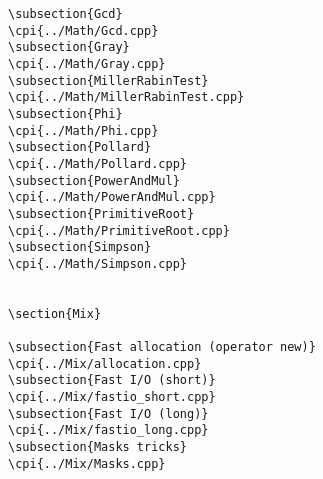 {\begin{verbatim}
\subsection{Gcd}
\cpi{../Math/Gcd.cpp}
\subsection{Gray}
\cpi{../Math/Gray.cpp}
\subsection{MillerRabinTest}
\cpi{../Math/MillerRabinTest.cpp}
\subsection{Phi}
\cpi{../Math/Phi.cpp}
\subsection{Pollard}
\cpi{../Math/Pollard.cpp}
\subsection{PowerAndMul}
\cpi{../Math/PowerAndMul.cpp}
\subsection{PrimitiveRoot}
\cpi{../Math/PrimitiveRoot.cpp}
\subsection{Simpson}
\cpi{../Math/Simpson.cpp}


\section{Mix}

\subsection{Fast allocation (operator new)}
\cpi{../Mix/allocation.cpp}
\subsection{Fast I/O (short)}
\cpi{../Mix/fastio_short.cpp}
\subsection{Fast I/O (long)}
\cpi{../Mix/fastio_long.cpp}
\subsection{Masks tricks}
\cpi{../Mix/Masks.cpp}

\end{verbatim}}
